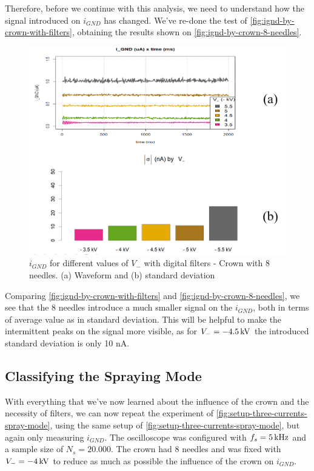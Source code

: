\documentclass[oneside,12pt]{article}
\begin{document}
Therefore, before we continue with this analysis, we need to understand how the signal introduced on $i_{GND}$ has changed. We've re-done 
the test of \autoref{fig:ignd-by-crown-with-filters}, obtaining the results shown on \autoref{fig:ignd-by-crown-8-needles}.

\begin{figure}[h!]
    \centering
    \includegraphics[width=1\textwidth,trim=1 1 1 1,clip]{figures/ignd-by-crown-8-needles.png}
    \caption{$i_{GND}$ for different values of $V_-$ with digital filters - Crown with 8 needles. (a) Waveform and (b) standard deviation}
    \label{fig:ignd-by-crown-8-needles}
\end{figure}

Comparing \autoref{fig:ignd-by-crown-with-filters} and \autoref{fig:ignd-by-crown-8-needles}, we see that the 8 needles introduce 
a much smaller signal on the $i_{GND}$, both in terms of average value as in standard deviation. This will be helpful to make  
the intermittent peaks on the signal more visible, as for $V_- = - 4.5 \,\mathrm{kV}$ the introduced standard deviation is only 10 nA.

\subsection{Classifying the Spraying Mode}

With everything that we've now learned about the influence of the crown and the necessity of filters, we can now repeat the experiment 
of \autoref{fig:setup-three-currents-spray-mode}, using the same setup of \autoref{fig:setup-three-currents-spray-mode}, but again only
measuring $i_{GND}$. The oscilloscope was configured with $f_s = 5 \,\mathrm{kHz}$ and a sample size of $N_s = 20.000$. The crown had 8 needles 
and was fixed with $V_- = - 4 \,\mathrm{kV}$ to reduce as much as possible the influence of the crown on $i_{GND}$.
\end{document}
